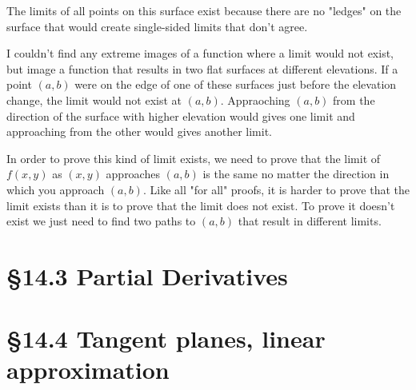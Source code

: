 \documentclass[12 pt]{article}
\begin{document}
        The limits of all points on this surface exist because there are no "ledges" on the surface that would create single-sided limits that don't agree.

        I couldn't find any extreme images of a function where a limit would not exist, but image a function that results in two flat surfaces at different elevations. If a point $(a,b)$ were on the edge of one of these surfaces just before the elevation change, the limit would not exist at $(a,b)$. Appraoching $(a,b)$ from the direction of the surface with higher elevation would gives one limit and approaching from the other would gives another limit.

        In order to prove this kind of limit exists, we need to prove that the limit of $f(x,y)$ as $(x,y)$ approaches $(a,b)$ is the same no matter the direction in which you approach $(a,b)$. Like all "for all" proofs, it is harder to prove that the limit exists than it is to prove that the limit does not exist. To prove it doesn't exist we just need to find two paths to $(a,b)$ that result in different limits.
    \section{\S 14.3 Partial Derivatives}
    \section{\S 14.4 Tangent planes, linear approximation}
\end{document}
